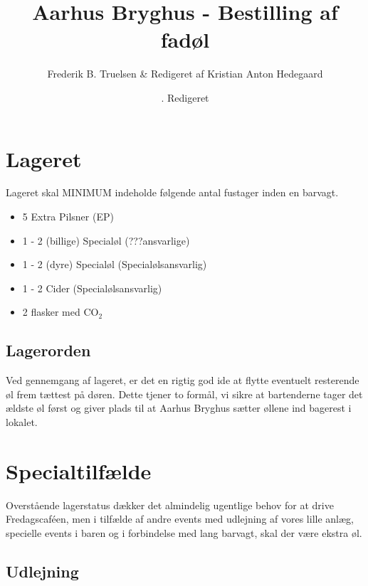 

\title{Aarhus Bryghus - Bestilling af fadøl}
\date{. Redigeret }
\author{Frederik B. Truelsen \& Redigeret af Kristian Anton Hedegaard}



\maketitle

\section{Lageret}

Lageret skal MINIMUM indeholde følgende antal fustager inden en barvagt.

\begin{itemize}
\item 5 Extra Pilsner (EP)
\item 1 - 2 (billige) Specialøl (???ansvarlige)
\item 1 - 2 (dyre) Specialøl (Specialølsansvarlig)
\item 1 - 2 Cider (Specialølsansvarlig)
\item 2 flasker med CO$_{2}$
\end{itemize}

\subsection{Lagerorden}

Ved gennemgang af lageret, er det en rigtig god ide at flytte eventuelt resterende øl frem tættest på døren.
Dette tjener to formål, vi sikre at bartenderne tager det ældste øl først og giver plads til at Aarhus Bryghus
sætter øllene ind bagerest i lokalet.

\section{Specialtilfælde}

Overstående lagerstatus dækker det almindelig ugentlige behov for at drive Fredagscaféen,
men i tilfælde af andre events med udlejning af vores lille anlæg, specielle events i baren og
i forbindelse med lang barvagt, skal der være ekstra øl.

\subsection{Udlejning}

